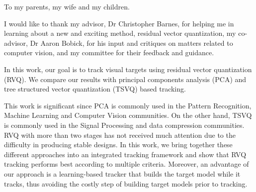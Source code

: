 


%
%
%
%
%
%
%








\begin{FrontMatter}

\begin{dedication}
To my parents, my wife and my children.
\end{dedication}

\begin{acknowledgement}
I would like to thank my advisor, Dr Christopher Barnes, for helping me in learning about a new and exciting method, residual vector quantization, my co-advisor, Dr Aaron Bobick, for his input and critiques on matters related to computer vision, and my committee for their feedback and guidance.\newpage
\end{acknowledgement}

\contents %

\end{FrontMatter}



\begin{summary}
In this work, our goal is to track visual targets using residual vector quantization (RVQ).  We compare our results with principal components analysis (PCA) and tree structured vector quantization (TSVQ) based tracking.

This work is significant since PCA is commonly used in the Pattern Recognition, Machine Learning and Computer Vision communities. On the other hand, TSVQ is commonly used in the Signal Processing and data compression communities. RVQ with more than two stages has not received much attention due to the difficulty in producing stable designs. In this work, we bring together these different approaches into an integrated tracking framework and show that RVQ tracking performs best according to multiple criteria. Moreover, an advantage of our approach is a learning-based tracker that builds the target model while it tracks, thus avoiding the costly step of building target models prior to tracking.
\end{summary}

